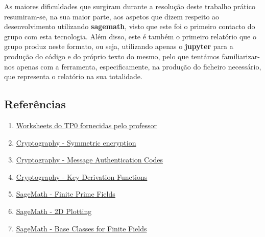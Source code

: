 \documentclass[11pt]{article}
\providecommand{\tightlist}{%
      \setlength{\itemsep}{0pt}\setlength{\parskip}{0pt}}
\begin{document}
As maiores dificuldades que surgiram durante a resolução deste trabalho
prático resumiram-se, na sua maior parte, aos aspetos que dizem respeito
ao desenvolvimento utilizando \textbf{sagemath}, visto que este foi o
primeiro contacto do grupo com esta tecnologia. Além disso, este é
também o primeiro relatório que o grupo produz neste formato, ou seja,
utilizando apenas o \textbf{jupyter} para a produção do código e do
próprio texto do mesmo, pelo que tentámos familiarizar-nos apenas com a
ferramenta, especificamente, na produção do ficheiro necessário, que
representa o relatório na sua totalidade.

    \hypertarget{referuxeancias}{%
\subsection{Referências}\label{referuxeancias}}

    \begin{enumerate}
\def\labelenumi{\arabic{enumi}.}
\tightlist
\item
  \href{https://www.dropbox.com/sh/f0j9adiaw4v3deb/AACBpI2YqgkN5iuVEas5P8wVa/WorkSheets/TP0?dl=0\&subfolder_nav_tracking=1}{Worksheets
  do TP0 fornecidas pelo professor}
\item
  \href{https://cryptography.io/en/latest/hazmat/primitives/symmetric-encryption/}{Cryptography
  - Symmetric encryption}
\item
  \href{https://cryptography.io/en/latest/hazmat/primitives/mac/}{Cryptography
  - Message Authentication Codes}
\item
  \href{https://cryptography.io/en/latest/hazmat/primitives/key-derivation-functions/}{Cryptography
  - Key Derivation Functions}
\item
  \href{http://doc.sagemath.org/html/en/reference/finite_rings/sage/rings/finite_rings/finite_field_prime_modn.html}{SageMath
  - Finite Prime Fields}
\item
  \href{http://doc.sagemath.org/html/en/reference/plotting/sage/plot/plot.html}{SageMath
  - 2D Plotting}
\item
  \href{http://doc.sagemath.org/html/en/reference/finite_rings/sage/rings/finite_rings/finite_field_base.html}{SageMath
  - Base Classes for Finite Fields}
\end{enumerate}


    
    
    
    
\end{document}
